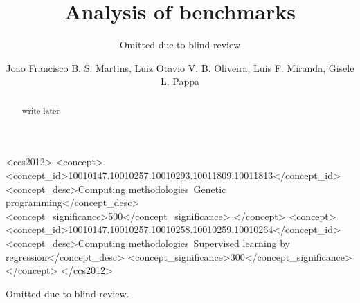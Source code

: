 \documentclass[sigconf, table]{acmart}
\newcommand{\jf}[1]{\textcolor{orange}{[#1]}}
\begin{document}
	
	\title{Analysis of benchmarks} 
	
	\author{Omitted due to blind review}
	
	
	\author{\Large Joao Francisco B. S. Martins, Luiz Otavio V. B. Oliveira, Luis F. Miranda, Gisele L. Pappa}
	
	\renewcommand{\shortauthors}{Martins et al.}
	
	\begin{abstract}
		
write later
		
	\end{abstract}
	
	\begin{CCSXML}
		<ccs2012>
		<concept>
		<concept_id>10010147.10010257.10010293.10011809.10011813</concept_id>
		<concept_desc>Computing methodologies~Genetic programming</concept_desc>
		<concept_significance>500</concept_significance>
		</concept>
		<concept>
		<concept_id>10010147.10010257.10010258.10010259.10010264</concept_id>
		<concept_desc>Computing methodologies~Supervised learning by regression</concept_desc>
		<concept_significance>300</concept_significance>
		</concept>
		</ccs2012>
	\end{CCSXML}
	
	
	
	
	\maketitle
	
	
	
	
	
	\begin{acks}
		Omitted due to blind review.
		
	\end{acks}
	
	
	
	
\end{document}
